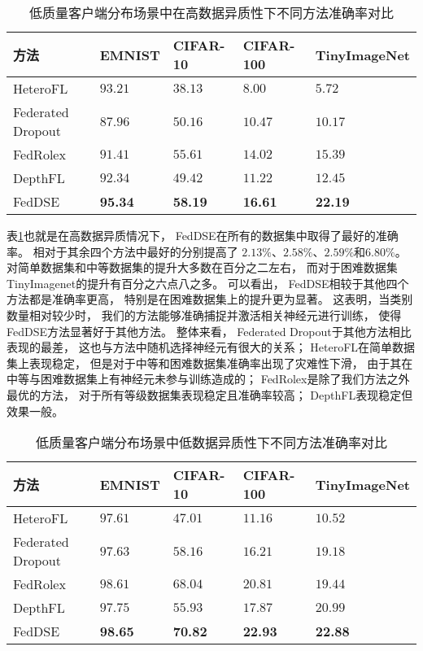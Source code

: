 \begin{table}[thbp]
    \caption{\label{tab:total_high_res}低质量客户端分布场景中在高数据异质性下不同方法准确率对比}
    \begin{tabularx}{\linewidth}{l X<{\centering} X<{\centering} X<{\centering} X<{\centering}}
        \toprule
        方法 & EMNIST & CIFAR-10 & CIFAR-100 & TinyImageNet \\ \hline
        HeteroFL & $93.21$ & $38.13$ & $8.00$ & $5.72$ \\ 
        Federated Dropout & $87.96$ & $50.16$ & $10.47$ & $10.17$ \\ 
        FedRolex & $91.41$ & $55.61$ & $14.02$ & $15.39$ \\ 
        DepthFL & $92.34$ & $49.42$ & $11.22$ & $12.45$ \\ 
        FedDSE & \textbf{95.34} & \textbf{58.19} & \textbf{16.61} & \textbf{22.19} \\ 
        \bottomrule
    \end{tabularx}
\end{table}
表\ref{tab:total_high_res}也就是在高数据异质情况下，
FedDSE在所有的数据集中取得了最好的准确率。
相对于其余四个方法中最好的分别提高了
$2.13\%$、$2.58 \%$、$2.59 \%$和$6.80\%$。
对简单数据集和中等数据集的提升大多数在百分之二左右，
而对于困难数据集TinyImagenet的提升有百分之六点八之多。
可以看出，
FedDSE相较于其他四个方法都是准确率更高，
特别是在困难数据集上的提升更为显著。
这表明，当类别数量相对较少时，
我们的方法能够准确捕捉并激活相关神经元进行训练，
使得FedDSE方法显著好于其他方法。
整体来看，
Federated Dropout于其他方法相比表现的最差，
这也与方法中随机选择神经元有很大的关系；
HeteroFL在简单数据集上表现稳定，
但是对于中等和困难数据集准确率出现了灾难性下滑，
由于其在中等与困难数据集上有神经元未参与训练造成的；
FedRolex是除了我们方法之外最优的方法，
对于所有等级数据集表现稳定且准确率较高；
DepthFL表现稳定但效果一般。
\begin{table}[thbp]
    \caption{\label{tab:total_low_res}低质量客户端分布场景中低数据异质性下不同方法准确率对比}
    \begin{tabularx}{\linewidth}{l X<{\centering} X<{\centering} X<{\centering} X<{\centering}}
        \toprule
        方法 & EMNIST & CIFAR-10 & CIFAR-100 & TinyImageNet \\ \hline
        HeteroFL & $97.61$ & $47.01$ & $11.16$ & $10.52$ \\ 
        Federated Dropout & $97.63$ & $58.16$ & $16.21$ & $19.18$ \\ 
        FedRolex & $98.61$ & $68.04$ & $20.81$ & $19.44$ \\ 
        DepthFL & $97.75$ & $55.93$ & $17.87$ & $20.99$ \\ 
        FedDSE & \textbf{98.65} & \textbf{70.82} & \textbf{22.93} & \textbf{22.88} \\ 
        \bottomrule
    \end{tabularx}
\end{table}

